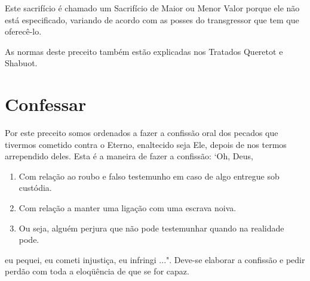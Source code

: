 \begin{itemize}
\begin{enumrate}
\begin{itemize}
\begin{itemize}
Este sacrifício é chamado um Sacrifício de Maior ou Menor Valor por­que
ele não está especificado, variando de acordo com as posses do
transgres­sor que tem que oferecê-lo.

As normas deste preceito também estão explicadas nos Tratados Que­retot
e Shabuot.

\section{Confessar}

Por este preceito somos ordenados a fazer a confissão oral dos peca­dos
que tivermos cometido contra o Eterno, enaltecido seja Ele, depois de
nos termos arrependido deles. Esta é a maneira de fazer a confissão:
`Oh, Deus,


\begin{enumerate}
\def\labelenumi{\arabic{enumi}.}
\setcounter{enumi}{89}
\item
 
 Com relação ao roubo e falso testemunho em caso de algo entregue sob
 custódia.
 
\item
 
 Com relação a manter uma ligação com uma escrava noiva.
 
\item
 
 Ou seja, alguém perjura que não pode testemunhar quando na realidade
 pode.
 
\end{enumerate}




eu pequei, eu cometi injustiça, eu infringi ...". Deve-se elaborar a
confissão e pedir perdão com toda a eloqüência de que se for capaz.


\end{itemize}
\end{itemize}
\end{enumrate}
\end{itemize}
